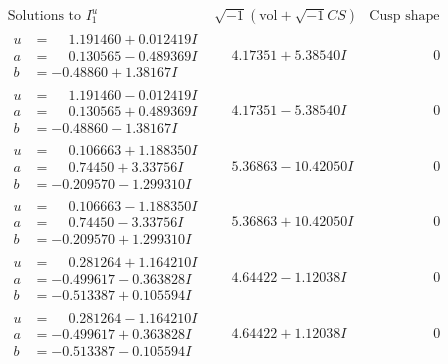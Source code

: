 \documentclass[1p]{elsarticle_modified}
\theoremstyle{definition}
\newcommand{\I}{\sqrt{-1}}
\begin{document}
$$\begin{array}{c|c|c}
\text{Solutions to }I^u_{1}& \I (\text{vol} + \sqrt{-1}CS) & \text{Cusp shape}\\
 \hline 
\begin{aligned}
u &= \phantom{-}1.191460 + 0.012419 I \\
a &= \phantom{-}0.130565 - 0.489369 I \\
b &= -0.48860 + 1.38167 I\end{aligned}
 & \phantom{-}4.17351 + 5.38540 I & \phantom{-0.000000 } 0 \\ \hline\begin{aligned}
u &= \phantom{-}1.191460 - 0.012419 I \\
a &= \phantom{-}0.130565 + 0.489369 I \\
b &= -0.48860 - 1.38167 I\end{aligned}
 & \phantom{-}4.17351 - 5.38540 I & \phantom{-0.000000 } 0 \\ \hline\begin{aligned}
u &= \phantom{-}0.106663 + 1.188350 I \\
a &= \phantom{-}0.74450 + 3.33756 I \\
b &= -0.209570 - 1.299310 I\end{aligned}
 & \phantom{-}5.36863 - 10.42050 I & \phantom{-0.000000 } 0 \\ \hline\begin{aligned}
u &= \phantom{-}0.106663 - 1.188350 I \\
a &= \phantom{-}0.74450 - 3.33756 I \\
b &= -0.209570 + 1.299310 I\end{aligned}
 & \phantom{-}5.36863 + 10.42050 I & \phantom{-0.000000 } 0 \\ \hline\begin{aligned}
u &= \phantom{-}0.281264 + 1.164210 I \\
a &= -0.499617 - 0.363828 I \\
b &= -0.513387 + 0.105594 I\end{aligned}
 & \phantom{-}4.64422 - 1.12038 I & \phantom{-0.000000 } 0 \\ \hline\begin{aligned}
u &= \phantom{-}0.281264 - 1.164210 I \\
a &= -0.499617 + 0.363828 I \\
b &= -0.513387 - 0.105594 I\end{aligned}
 & \phantom{-}4.64422 + 1.12038 I & \phantom{-0.000000 } 0 \\ \hline\begin{aligned}

\end{aligned}
\end{array}$$
\end{document}

